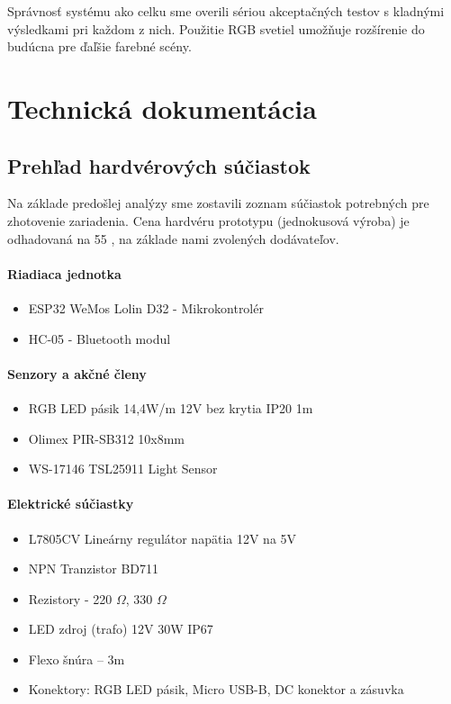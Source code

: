 \documentclass[12pt, a4paper]{article}
\begin{document}
Správnosť systému ako celku sme overili sériou akceptačných testov s kladnými výsledkami pri každom z nich. Použitie RGB svetiel umožňuje rozšírenie do budúcna pre ďaľšie farebné scény.

\printbibliography[title={Zoznam použitej literatúry}]

\section{Technická dokumentácia}
\subsection{Prehľad hardvérových súčiastok}
Na základe predošlej analýzy sme zostavili zoznam súčiastok potrebných pre zhotovenie zariadenia. Cena hardvéru prototypu (jednokusová výroba) je odhadovaná na 55 \texteuro, na základe nami zvolených dodávateľov.

\paragraph{Riadiaca jednotka}
\begin{itemize}
\itemsep0pt
\item ESP32 WeMos Lolin D32 - Mikrokontrolér
\item HC-05 - Bluetooth modul
\end{itemize}

\paragraph{Senzory a akčné členy}
\begin{itemize}
\itemsep0pt
\item RGB LED pásik 14,4W/m 12V bez krytia IP20 1m
\item Olimex PIR-SB312 10x8mm 
\item WS-17146 TSL25911 Light Sensor
\end{itemize}

\paragraph{Elektrické súčiastky}
\begin{itemize}
\itemsep0pt
\item L7805CV Lineárny regulátor napätia 12V na 5V
\item NPN Tranzistor BD711 
\item Rezistory - 220 $\Omega$, 330 $\Omega$
\item LED zdroj (trafo) 12V 30W IP67
\item Flexo šnúra – 3m
\item Konektory: RGB LED pásik, Micro USB-B, DC konektor a zásuvka
\end{itemize}
\end{document}
